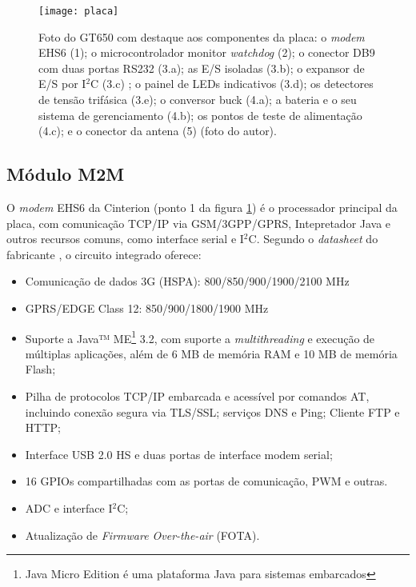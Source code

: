           
    \begin{figure}
        \centering
        \texttt{[image: placa]}
        \caption{Foto do GT650 com destaque aos componentes da placa: o \textit{modem} EHS6 (1); o microcontrolador monitor \textit{watchdog} (2); o conector DB9 com duas portas RS232 (3.a); as E/S isoladas (3.b); o expansor de E/S por I$^{2}$C (3.c) ; o painel de LEDs indicativos (3.d); os detectores de tensão trifásica (3.e); o conversor buck (4.a); a bateria e o seu sistema de gerenciamento (4.b); os pontos de teste de alimentação (4.c); e o conector da antena (5) (foto do autor).}
        \label{fig:placa}
    \end{figure}
    
    \subsection{Módulo M2M}
        O \textit{modem} EHS6 da Cinterion (ponto 1 da figura \ref{fig:placa}) é o processador principal da placa, com comunicação TCP/IP via GSM/3GPP/GPRS, Intepretador Java e outros recursos comuns, como interface serial e I$^{2}$C. Segundo o \textit{datasheet} do fabricante \citep{cinterion2016}, o circuito integrado oferece: 
        
        \begin{itemize}
            \item Comunicação de dados 3G (HSPA): 800/850/900/1900/2100 MHz
            \item GPRS/EDGE Class 12: 850/900/1800/1900 MHz
            \item Suporte a Java™ ME\footnote{Java Micro Edition é  uma plataforma Java para sistemas embarcados} 3.2, com suporte a \textit{multithreading} e execução de múltiplas aplicações, além de 6 MB de memória RAM e 10 MB de memória Flash;  %
            \item Pilha de protocolos TCP/IP embarcada e acessível por comandos AT, incluindo conexão segura via TLS/SSL; serviços DNS e Ping; Cliente FTP e HTTP; %
            \item Interface USB 2.0 HS e duas portas de interface modem serial;
            \item 16 GPIOs compartilhadas com as portas de comunicação, PWM e outras.
            \item ADC e interface I$^{2}$C; 
            \item Atualização de \textit{Firmware Over-the-air} (FOTA).
        \end{itemize}
        
